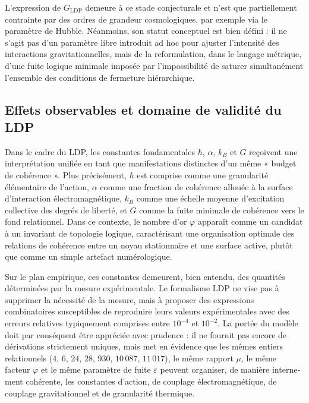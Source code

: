\documentclass[11pt,a4paper]{article}
\begin{document}
L’expression de \(G_{\mathrm{LDP}}\) demeure à ce stade conjecturale et n’est que partiellement contrainte par des ordres de grandeur cosmologiques, par exemple via le paramètre de Hubble. Néanmoins, son statut conceptuel est bien défini : il ne s’agit pas d’un paramètre libre introduit ad hoc pour ajuster l’intensité des interactions gravitationnelles, mais de la reformulation, dans le langage métrique, d’une fuite logique minimale imposée par l’impossibilité de saturer simultanément l’ensemble des conditions de fermeture hiérarchique.

\subsection{Effets observables et domaine de validité du LDP}

Dans le cadre du LDP, les constantes fondamentales \(\hbar\), \(\alpha\), \(k_B\) et \(G\) reçoivent une interprétation unifiée en tant que manifestations distinctes d’un même « budget de cohérence ». Plus précisément, \(\hbar\) est comprise comme une granularité élémentaire de l’action, \(\alpha\) comme une fraction de cohérence allouée à la surface d’interaction électromagnétique, \(k_B\) comme une échelle moyenne d’excitation collective des degrés de liberté, et \(G\) comme la fuite minimale de cohérence vers le fond relationnel. Dans ce contexte, le nombre d’or \(\varphi\) apparaît comme un candidat à un invariant de topologie logique, caractérisant une organisation optimale des relations de cohérence entre un noyau stationnaire et une surface active, plutôt que comme un simple artefact numérologique. 

Sur le plan empirique, ces constantes demeurent, bien entendu, des quantités déterminées par la mesure expérimentale. Le formalisme LDP ne vise pas à supprimer la nécessité de la mesure, mais à proposer des expressions combinatoires susceptibles de reproduire leurs valeurs expérimentales avec des erreurs relatives typiquement comprises entre \(10^{-4}\) et \(10^{-2}\). La portée du modèle doit par conséquent être appréciée avec prudence : il ne fournit pas encore de dérivations strictement uniques, mais met en évidence que les mêmes entiers relationnels (\(4\), \(6\), \(24\), \(28\), \(930\), \(10\,087\), \(11\,017\)), le même rapport \(\mu\), le même facteur \(\varphi\) et le même paramètre de fuite \(\varepsilon\) peuvent organiser, de manière interne­ment cohérente, les constantes d’action, de couplage électromagnétique, de couplage gravitationnel et de granularité thermique.
\end{document}
